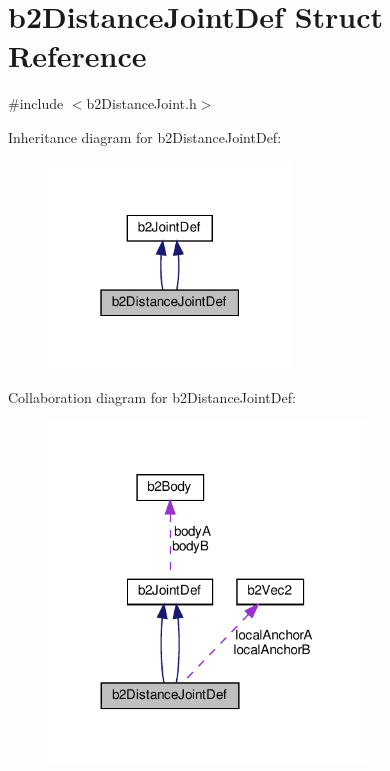 \hypertarget{structb2DistanceJointDef}{}\section{b2\+Distance\+Joint\+Def Struct Reference}
\label{structb2DistanceJointDef}


{\ttfamily \#include $<$b2\+Distance\+Joint.\+h$>$}



Inheritance diagram for b2\+Distance\+Joint\+Def\+:
\nopagebreak
\begin{figure}[H]
\begin{center}
\leavevmode
\includegraphics[width=183pt]{structb2DistanceJointDef__inherit__graph}
\end{center}
\end{figure}


Collaboration diagram for b2\+Distance\+Joint\+Def\+:
\nopagebreak
\begin{figure}[H]
\begin{center}
\leavevmode
\includegraphics[width=239pt]{structb2DistanceJointDef__coll__graph}
\end{center}
\end{figure}
